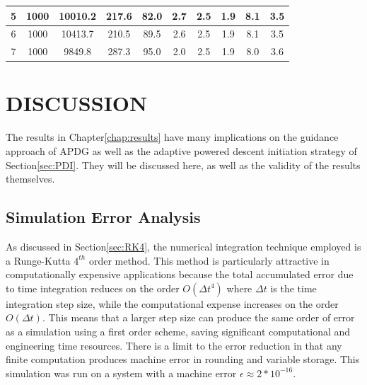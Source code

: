 \begin{table}[ht]
\begin{tabular}{|c|c|c|c|c|c|c|c|c|c|}
		\hline                                                                                                        
		5 & 1000 & 10010.2 & 217.6 & 82.0 & 2.7 & 2.5 & 1.9 & 8.1 & 3.5 \\                                             
		\hline                                                                                                        
		6 & 1000 & 10413.7 & 210.5 & 89.5 & 2.6 & 2.5 & 1.9 & 8.1 & 3.5 \\                                             
		\hline                                                                                                        
		7 & 1000 & 9849.8 & 287.3 & 95.0 & 2.0 & 2.5 & 1.9 & 8.0 & 3.6 \\                                              
		\hline                                                                                                        
	\end{tabular}
\end{table}   

\chapter{DISCUSSION} \label{chap:discussion}

The results in Chapter\:\ref{chap:results} have many implications on the guidance approach of APDG as well as the adaptive powered descent initiation strategy of Section\:\ref{sec:PDI}. They will be discussed here, as well as the validity of the results themselves.

\section{Simulation Error Analysis} \label{sec:convergence}
As discussed in Section\:\ref{sec:RK4}, the numerical integration technique employed is a Runge-Kutta $4^{th}$ order method. This method is particularly attractive in computationally expensive applications because the total accumulated error due to time integration reduces on the order $O(\Delta t^4)$ where $\Delta t$ is the time integration step size, while the computational expense increases on the order $O(\Delta t)$. This means that a larger step size can produce the same order of error as a simulation using a first order scheme, saving significant computational and engineering time resources. There is a limit to the error reduction in that any finite computation produces machine error in rounding and variable storage. This simulation was run on a system with a machine error $\epsilon \approx 2*10^{-16}$.

